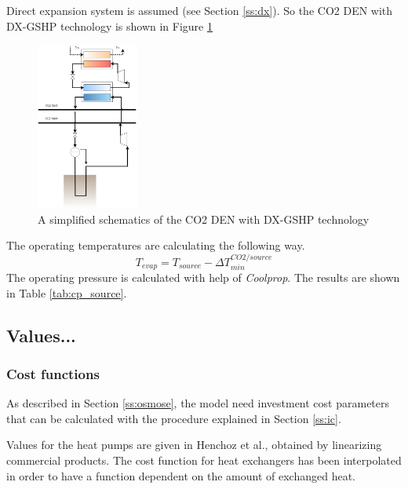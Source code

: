 \documentclass{article}
\begin{document}
Direct expansion system is assumed (see Section \ref{ss:dx}).
So the CO2 DEN with DX-GSHP technology is shown in Figure \ref{fig:co2_gshp}

\begin{figure}[htp]
	\centering
	\includegraphics[width=0.3\textwidth]{CO2-DX-GSHP.png}
	\caption{A simplified schematics of the CO2 DEN with DX-GSHP technology}
	\label{fig:co2_gshp}
\end{figure}

The operating temperatures are calculating the following way.
\begin{equation}
    T_{evap} = T_{source} - \Delta T_{min}^{CO2/source}
\end{equation}
The operating pressure is calculated with help of \textit{Coolprop}. The results are shown in Table \ref{tab:cp_source}.



\subsection{Values...}

\subsubsection{Cost functions}

As described in Section \ref{ss:osmose}, the model need investment cost parameters that can be calculated with the procedure explained in Section \ref{ss:ic}.

Values for the heat pumps are given in Henchoz et al., obtained by linearizing commercial products\cite{henchozPerformanceProfitabilityPerspectives2015}. The cost function for heat exchangers has been interpolated in order to have a function dependent on the amount of exchanged heat.
\end{document}
